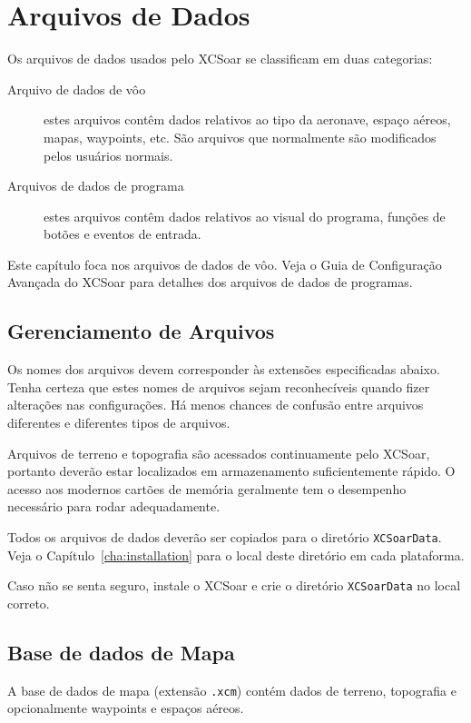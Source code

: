 \chapter{Arquivos de Dados}\label{cha:data-files}

Os arquivos de dados usados pelo XCSoar se classificam em duas categorias:
\begin{description}
\item[Arquivo de dados de vôo]  estes arquivos contêm dados relativos ao tipo da aeronave, espaço aéreos, mapas, waypoints, etc.  São arquivos que normalmente são modificados pelos usuários normais.
\item[Arquivos de dados de programa]  estes arquivos contêm dados relativos ao visual do programa, funções de botões e eventos de entrada.  
\end{description}
Este capítulo foca nos arquivos de dados de vôo. Veja o Guia de Configuração Avançada do XCSoar para detalhes dos arquivos de dados de programas.
 

\section{Gerenciamento de Arquivos}

Os nomes dos arquivos devem corresponder às extensões especificadas abaixo.  Tenha certeza que estes nomes de arquivos sejam reconhecíveis quando fizer alterações nas configurações.  Há menos chances de confusão entre arquivos diferentes e diferentes tipos de arquivos.

Arquivos de terreno e topografia são acessados continuamente pelo XCSoar, portanto deverão estar localizados em armazenamento suficientemente rápido.  O acesso aos modernos cartões de memória geralmente tem o desempenho necessário para rodar adequadamente.

Todos os arquivos de dados deverão ser copiados para o diretório
\verb|XCSoarData|.  Veja o Capítulo~\ref{cha:installation} para o local deste diretório em cada plataforma.

Caso não se senta seguro, instale o XCSoar e crie o diretório  \verb|XCSoarData|
no local correto. 
 

\section{Base de dados de Mapa}\label{sec:map}

A base de dados de mapa (extensão  \verb|.xcm|) contém dados de terreno, topografia e opcionalmente waypoints e espaços aéreos.

